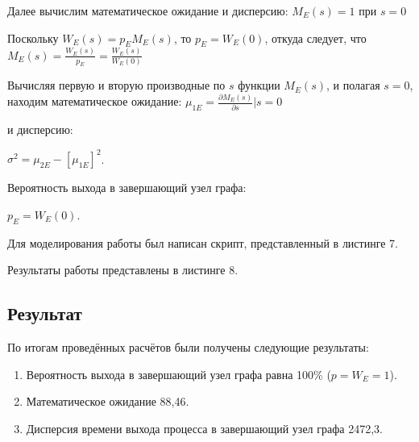 Далее вычислим математическое ожидание и дисперсию: $M_E(s) = 1$ при $s=0$

Поскольку $W_E(s)=p_E M_E (s)$,  то  $p_E=W_E(0)$,  откуда следует, что $M_E(s)=\frac{W_E(s)}{p_E} =\frac{W_E(s)}{W_E(0)}$

Вычисляя первую и вторую производные по $s$ функции $M_E(s)$, и полагая $s=0$, находим математическое ожидание:
$\mu_{1E}=\frac{\partial M_E(s)}{\partial s}|s=0$

и дисперсию:

$\sigma^2=\mu_{2E}-[\mu_{1E}]^2$.

Вероятность выхода в завершающий узел графа:

$p_E=W_E (0)$.

Для моделирования работы был написан скрипт, представленный в листинге 7.




Результаты работы представлены в листинге 8.



\subsection{Результат}

По итогам проведённых расчётов были получены следующие результаты:
\begin{enumerate}
	\item Вероятность выхода в завершающий узел графа равна 100\% ($p=W_E=1$).
	\item Математическое ожидание 88,46.
	\item Дисперсия времени выхода процесса в завершающий узел графа 2472,3.
\end{enumerate}
